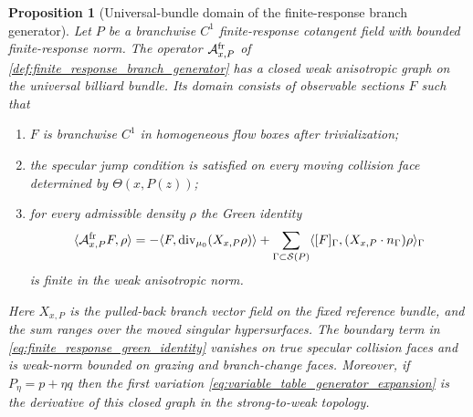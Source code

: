 \documentclass[12pt, letterpaper]{amsart}
\newcommand{\Acal}{\mathcal{A}}
\providecommand{\Ssing}{\mathcal{S}}
\theoremstyle{plain}
\newtheorem{proposition}[theorem]{Proposition}
\theoremstyle{definition}
\theoremstyle{remark}
\begin{document}
\begin{proposition}[Universal-bundle domain of the finite-response branch generator]
\label{prop:universal_bundle_branch_generator_domain}
Let $P$ be a branchwise $C^1$ finite-response cotangent field with bounded
finite-response norm.  The operator $\Acal^{\rm fr}_{x,P}$ of
\cref{def:finite_response_branch_generator} has a closed weak anisotropic graph
on the universal billiard bundle.  Its domain consists of observable sections
$F$ such that
\begin{enumerate}[label=\textup{(\alph*)}, wide, labelindent=0pt]
    \item $F$ is branchwise $C^1$ in homogeneous flow boxes after trivialization;
    \item the specular jump condition is satisfied on every moving collision
    face determined by $\Theta(x,P(z))$;
    \item for every admissible density $\rho$ the Green identity
    \begin{equation}
\label{eq:finite_response_green_identity}
        \langle \Acal^{\rm fr}_{x,P}F,\rho\rangle
        =-\langle F,\operatorname{div}_{\mu_0}(X_{x,P}\rho)\rangle
          +\sum_{\Gamma\subset\Ssing(P)}
             \langle [F]_{\Gamma},(X_{x,P}\cdot n_\Gamma)\rho\rangle_\Gamma
    \end{equation}
    is finite in the weak anisotropic norm.
\end{enumerate}
Here $X_{x,P}$ is the pulled-back branch vector field on the fixed reference
bundle, and the sum ranges over the moved singular hypersurfaces.  The boundary
term in \eqref{eq:finite_response_green_identity} vanishes on true specular
collision faces and is weak-norm bounded on grazing and branch-change faces.
Moreover, if $P_\eta=p+\eta q$ then the first variation
\eqref{eq:variable_table_generator_expansion} is the derivative of this closed
graph in the strong-to-weak topology.
\end{proposition}
\end{document}
